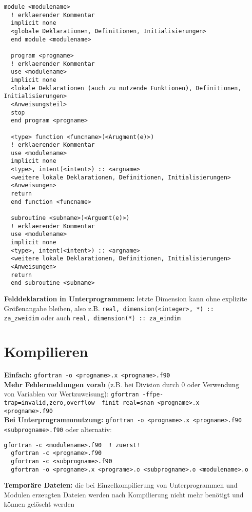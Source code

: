 \documentclass[a4paper, twocolumn]{scrarticle}
\begin{document}
\begin{lstlisting}[caption={\bfseries Dateischema Modul, Haupt- und Unterprogramme }]
  module <modulename>
  ! erklaerender Kommentar
  implicit none
  <globale Deklarationen, Definitionen, Initialisierungen>
  end module <modulename>
  
  program <progname>
  ! erklaerender Kommentar
  use <modulename>
  implicit none
  <lokale Deklarationen (auch zu nutzende Funktionen), Definitionen, Initialisierungen>
  <Anweisungsteil>
  stop
  end program <progname>
  
  <type> function <funcname>(<Arugment(e)>)
  ! erklaerender Kommentar
  use <modulename>
  implicit none
  <type>, intent(<intent>) :: <argname>
  <weitere lokale Deklarationen, Definitionen, Initialisierungen>
  <Anweisungen>
  return
  end function <funcname>
  
  subroutine <subname>(<Arguemt(e)>)
  ! erklaerender Kommentar
  use <modulename>
  implicit none
  <type>, intent(<intent>) :: <argname>
  <weitere lokale Deklarationen, Definitionen, Initialisierungen>
  <Anweisungen>
  return
  end subroutine <subname>
\end{lstlisting}
\textbf{Felddeklaration in Unterprogrammen:} letzte Dimension kann ohne explizite Größenangabe bleiben, also z.B. \lstinline|real, dimension(<integer>, *) :: za_zweidim| oder auch \lstinline|real, dimension(*) :: za_eindim|

\section{Kompilieren}
\textbf{Einfach:} \lstinline[style=neutral]|gfortran -o <progname>.x <progname>.f90| \\
\textbf{Mehr Fehlermeldungen vorab} (z.B. bei Division durch 0 oder Verwendung von Variablen vor Wertzuweisung): \lstinline[style=neutral]|gfortran -ffpe-trap=invalid,zero,overflow -finit-real=snan <progname>.x <progname>.f90|\\
\textbf{Bei Unterprogrammnutzung:} \lstinline[style=neutral]|gfortran -o <progname>.x <progname>.f90 <subprogname>.f90| oder alternativ:
\begin{lstlisting}[style=neutral,caption={\textbf{Kompilieren von Haupt- und Unterprogrammenn}}]
  gfortran -c <modulename>.f90  ! zuerst!
  gfortran -c <progname>.f90 
  gfortran -c <subprogname>.f90 
  gfortran -o <progname>.x <programe>.o <subprogname>.o <modulename>.o
\end{lstlisting}
\textbf{Temporäre Dateien:} die bei Einzelkompilierung von Unterprogrammen und Modulen erzeugten Dateien werden nach Kompilierung nicht mehr benötigt und können gelöscht werden
\end{document}
